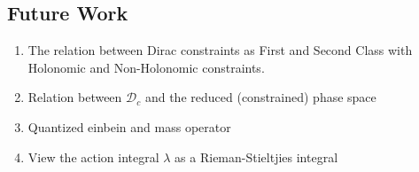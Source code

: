 \documentclass[a4paper,10pt]{article}
\numberwithin{equation}{section}
\begin{document}
\subsection{Future Work}
\begin{enumerate}
    \item 
    The relation between Dirac constraints as First and Second Class with Holonomic and Non-Holonomic constraints.
    
    \item  
    Relation between $\mathcal{D}_c$ and the reduced (constrained) phase space

    \item
    Quantized einbein and mass operator
    
    \item 
    View the action integral $\lambda$ as a Rieman-Stieltjies integral
    
    
\end{enumerate}


\newpage
\end{document}
